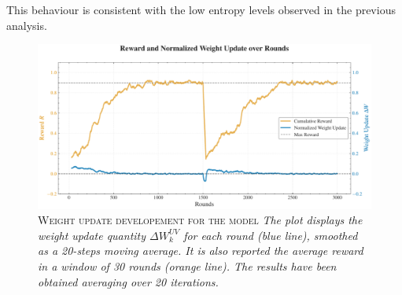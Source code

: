 This behaviour is consistent with the low entropy levels observed in the previous analysis.


\begin{figure}[H]
    \centering
    \includegraphics[width=1.0\textwidth]{figures/reward_update_plot.pdf}
    \caption{\textsc{Weight update developement for the model} \textit{The plot displays the weight update quantity $\Delta W_{k}^{UV}$ for each round (blue line), smoothed as a 20-steps moving average.
    It is also reported the average reward in a window of 30 rounds (orange line). The results have been obtained averaging over 20 iterations.}}
    \label{fig:rew_update}
\end{figure}





